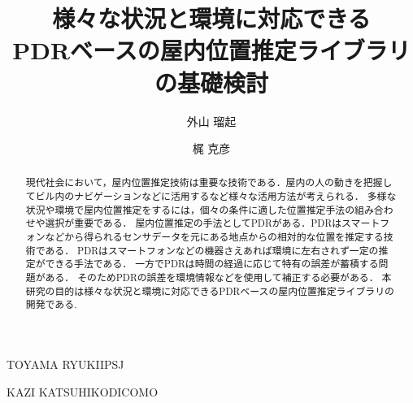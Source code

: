 \documentclass[Japanese]{dicomopapers}
\begin{document}
\title{様々な状況と環境に対応できる\\PDRベースの屋内位置推定ライブラリの基礎検討}



\author{外山 瑠起}{TOYAMA RYUKI}{IPSJ}
\author{梶 克彦}{KAZI KATSUHIKO}{DICOMO}

\begin{abstract}
	現代社会において，屋内位置推定技術は重要な技術である．屋内の人の動きを把握してビル内のナビゲーションなどに活用するなど様々な活用方法が考えられる．
	多様な状況や環境で屋内位置推定をするには，個々の条件に適した位置推定手法の組み合わせや選択が重要である．
	屋内位置推定の手法としてPDRがある．PDRはスマートフォンなどから得られるセンサデータを元にある地点からの相対的な位置を推定する技術である．
	PDRはスマートフォンなどの機器さえあれば環境に左右されず一定の推定ができる手法である．
	一方でPDRは時間の経過に応じて特有の誤差が蓄積する問題がある．
	そのためPDRの誤差を環境情報などを使用して補正する必要がある．
	本研究の目的は様々な状況と環境に対応できるPDRベースの屋内位置推定ライブラリの開発である.
\end{abstract}

\maketitle















\end{document}
